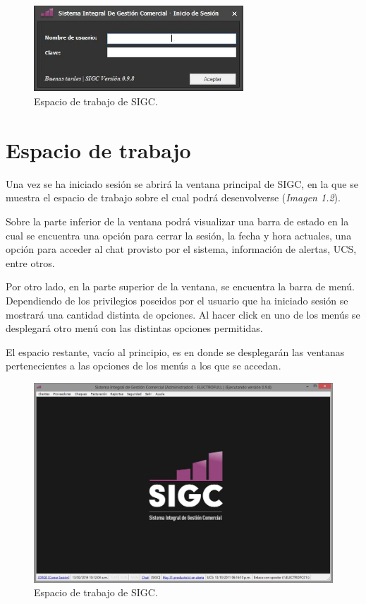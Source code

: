 \documentclass{book}
\begin{document}
\begin{figure}[H]
	\centering
	\includegraphics[width=0.70\textwidth]{images/ventanas/ventana-01.jpg}
	\medskip
	\caption{Espacio de trabajo de SIGC.}
\end{figure}
\bigskip


\section{Espacio de trabajo}

Una vez se ha iniciado sesión se abrirá la ventana principal de SIGC, en la que se muestra el espacio de trabajo sobre el cual podrá desenvolverse (\textit{Imagen 1.2}). 
\par
Sobre la parte inferior de la ventana podrá visualizar una barra de estado en la cual se encuentra una opción para cerrar la sesión, la fecha y hora actuales, una opción para acceder al chat provisto por el sistema, información de alertas, UCS, entre otros.
\par
Por otro lado, en la parte superior de la ventana, se encuentra la barra de menú. Dependiendo de los privilegios poseidos por el usuario que ha iniciado sesión se mostrará una cantidad distinta de opciones. Al hacer click en uno de los menús se desplegará otro menú con las distintas opciones permitidas.
\par
El espacio restante, vacío al principio, es en donde se desplegarán las ventanas pertenecientes a las opciones de los menús a los que se accedan.
\bigskip

\begin{figure}[H]
	\centering
	\includegraphics[width=1.0\textwidth]{images/ventanas/ventana-02.jpg}
	\medskip
	\caption{Espacio de trabajo de SIGC.}
\end{figure}
\bigskip
\end{document}
